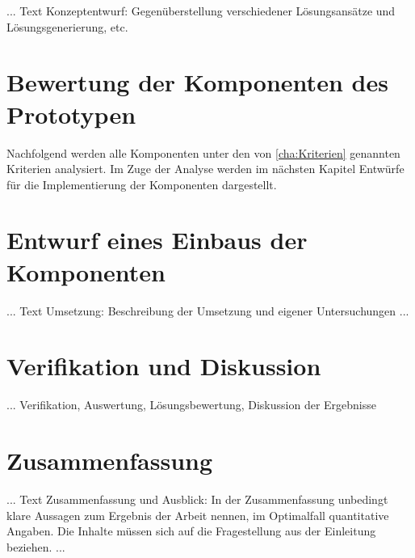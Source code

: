 ... Text Konzeptentwurf: Gegenüberstellung verschiedener Lösungsansätze und Lösungsgenerierung, etc.

\chapter{Bewertung der Komponenten des Prototypen}
\label{cha:Bewertung}
Nachfolgend werden alle Komponenten unter den von \ref{cha:Kriterien} genannten Kriterien analysiert. Im Zuge der Analyse werden im nächsten Kapitel Entwürfe für die Implementierung der Komponenten dargestellt.

\chapter{Entwurf eines Einbaus der Komponenten}
\label{cha:Konzeptentwurf}

... Text Umsetzung: Beschreibung der Umsetzung und eigener Untersuchungen ...



\chapter{Verifikation und Diskussion}
\label{cha:Verifikation}

... Verifikation, Auswertung, Lösungsbewertung, Diskussion der Ergebnisse

\chapter{Zusammenfassung}
\label{cha:zusammenfassung}

... Text Zusammenfassung und Ausblick: In der Zusammenfassung unbedingt klare Aussagen zum Ergebnis der Arbeit nennen, im Optimalfall quantitative Angaben. Die Inhalte müssen sich auf die Fragestellung aus der Einleitung  beziehen. ...